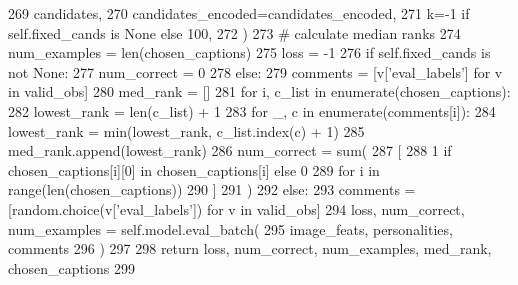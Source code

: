 \begin{DoxyCode}
269                 candidates,
270                 candidates\_encoded=candidates\_encoded,
271                 k=-1 \textcolor{keywordflow}{if} self.fixed\_cands \textcolor{keywordflow}{is} \textcolor{keywordtype}{None} \textcolor{keywordflow}{else} 100,
272             )
273             \textcolor{comment}{# calculate median ranks}
274             num\_examples = len(chosen\_captions)
275             loss = -1
276             \textcolor{keywordflow}{if} self.fixed\_cands \textcolor{keywordflow}{is} \textcolor{keywordflow}{not} \textcolor{keywordtype}{None}:
277                 num\_correct = 0
278             \textcolor{keywordflow}{else}:
279                 comments = [v[\textcolor{stringliteral}{'eval\_labels'}] \textcolor{keywordflow}{for} v \textcolor{keywordflow}{in} valid\_obs]
280                 med\_rank = []
281                 \textcolor{keywordflow}{for} i, c\_list \textcolor{keywordflow}{in} enumerate(chosen\_captions):
282                     lowest\_rank = len(c\_list) + 1
283                     \textcolor{keywordflow}{for} \_, c \textcolor{keywordflow}{in} enumerate(comments[i]):
284                         lowest\_rank = min(lowest\_rank, c\_list.index(c) + 1)
285                     med\_rank.append(lowest\_rank)
286                 num\_correct = sum(
287                     [
288                         1 \textcolor{keywordflow}{if} chosen\_captions[i][0] \textcolor{keywordflow}{in} chosen\_captions[i] \textcolor{keywordflow}{else} 0
289                         \textcolor{keywordflow}{for} i \textcolor{keywordflow}{in} range(len(chosen\_captions))
290                     ]
291                 )
292         \textcolor{keywordflow}{else}:
293             comments = [random.choice(v[\textcolor{stringliteral}{'eval\_labels'}]) \textcolor{keywordflow}{for} v \textcolor{keywordflow}{in} valid\_obs]
294             loss, num\_correct, num\_examples = self.model.eval\_batch(
295                 image\_feats, personalities, comments
296             )
297 
298         \textcolor{keywordflow}{return} loss, num\_correct, num\_examples, med\_rank, chosen\_captions
299 
\end{DoxyCode}
\mbox{\label{classprojects_1_1personality__captions_1_1transresnet_1_1transresnet_1_1TransresnetAgent_acd07a9e73c6f58600c0db97331ff26f4}} 
